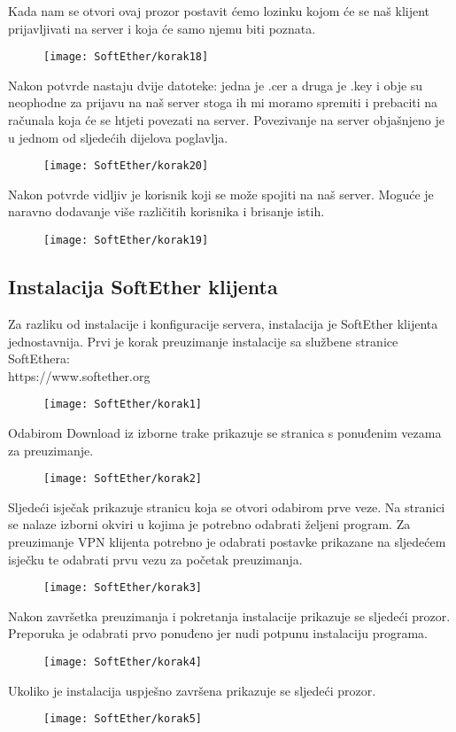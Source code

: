 \FloatBarrier
Kada nam se otvori ovaj prozor postavit ćemo lozinku kojom će se naš klijent prijavljivati na server i koja će samo njemu biti poznata.
\begin{figure}[h!]
     \centering
     \texttt{[image: SoftEther/korak18]}
\end{figure}
\FloatBarrier
Nakon potvrde nastaju dvije datoteke: jedna je .cer a druga je .key i obje su neophodne za prijavu na naš server stoga ih mi moramo spremiti i prebaciti na računala koja će se htjeti povezati na server. Povezivanje na server objašnjeno je u jednom od sljedećih dijelova poglavlja.
\begin{figure}[h!]
     \centering
     \texttt{[image: SoftEther/korak20]}
\end{figure}
\FloatBarrier
Nakon potvrde vidljiv je korisnik koji se može spojiti na naš server. Moguće je naravno dodavanje više različitih korisnika i brisanje istih.
\begin{figure}[h!]
     \centering
     \texttt{[image: SoftEther/korak19]}
\end{figure}
\FloatBarrier

\newpage
\subsection*{Instalacija SoftEther klijenta}
\hspace{0.5cm}
Za razliku od instalacije i konfiguracije servera, instalacija je SoftEther klijenta jednostavnija. Prvi je korak preuzimanje instalacije sa službene stranice SoftEthera:\\ https://www.softether.org
\begin{figure}[h!]
	\centering
     \texttt{[image: SoftEther/korak1]}
\end{figure}
\FloatBarrier
Odabirom Download iz izborne trake prikazuje se stranica s ponuđenim vezama za preuzimanje.
\begin{figure}[h!]
     \centering
     \texttt{[image: SoftEther/korak2]}
\end{figure}
\FloatBarrier
Sljedeći isječak prikazuje stranicu koja se otvori odabirom prve veze. Na stranici se nalaze izborni okviri u kojima je potrebno odabrati željeni program. Za preuzimanje VPN klijenta potrebno je odabrati postavke prikazane na sljedećem isječku te odabrati prvu vezu za početak preuzimanja.
\begin{figure}[h!]
     \centering
     \texttt{[image: SoftEther/korak3]}
\end{figure}
\FloatBarrier
Nakon završetka preuzimanja i pokretanja instalacije prikazuje se sljedeći prozor. Preporuka je odabrati prvo ponuđeno jer nudi potpunu instalaciju programa.
\begin{figure}[h!]
     \centering
     \texttt{[image: SoftEther/korak4]}
\end{figure}
\FloatBarrier
Ukoliko je instalacija uspješno završena prikazuje se sljedeći prozor.
\begin{figure}[h!]
     \centering
     \texttt{[image: SoftEther/korak5]}
\end{figure}
\FloatBarrier


